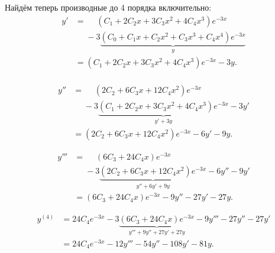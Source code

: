 \documentclass[a4paper,12pt]{article}
\begin{document}
Найдём теперь производные до 4 порядка включительно:
\begin{equation*}
    \begin{aligned}
        y' &= \phantom{-3} (C_1 + 2 C_2 x + 3 C_3 x^2 + 4 C_4 x^3) e^{-3x} \\
           & \phantom{= } -3
           \underbrace{
               (C_0 + C_1 x + C_2 x^2 + C_3 x^3 + C_4 x^4) e^{-3x}
           }_{\displaystyle y} \\
           &= (C_1 + 2 C_2 x + 3 C_3 x^2 + 4 C_4 x^3) e^{-3x} - 3y. \\
    \end{aligned}
\end{equation*}

\begin{equation*}
    \begin{aligned}
        y'' &= \phantom{-3} (2 C_2 + 6 C_3 x + 12 C_4 x^2) e^{-3x} \\
           & \phantom{= } -3
           \underbrace{
               (C_1 + 2 C_2 x + 3 C_3 x^2 + 4 C_4 x^3) e^{-3x}
           }_{\displaystyle y' + 3y} - 3y' \\
           &= (2 C_2 + 6 C_3 x + 12 C_4 x^2) e^{-3x} - 6y' - 9y.
    \end{aligned}
\end{equation*}

\begin{equation*}
    \begin{aligned}
        y''' &= \phantom{-3} (6 C_3 + 24 C_4 x) e^{-3x} \\
           & \phantom{= } -3
           \underbrace{
               (2 C_2 + 6 C_3 x + 12 C_4 x^2) e^{-3x}
           }_{\displaystyle y'' + 6y' + 9y} - 6y'' - 9y' \\
           &= (6 C_3 + 24 C_4 x) e^{-3x} - 9y'' - 27y' - 27y.
    \end{aligned}
\end{equation*}

\begin{equation*}
    \begin{aligned}
        y^{(4)} &= 24 C_4 e^{-3x} -3
           \underbrace{
               (6 C_3 + 24 C_4 x) e^{-3x}
           }_{\displaystyle y''' + 9y'' + 27y' + 27y} - 9y''' - 27y'' - 27y' \\
           &= 24 C_4 e^{-3x} - 12 y''' - 54 y'' - 108 y' - 81y.
    \end{aligned}
\end{equation*}
\end{document}
